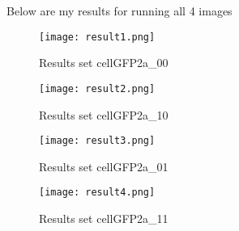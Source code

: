 \documentclass[paper=letter, fontsize=11pt]{scrartcl}
\numberwithin{equation}{section}		%
\numberwithin{figure}{section}			%
\numberwithin{table}{section}				%
\begin{document}
\if

Below are my results for running all 4 images
\begin{figure}[H]
\begin{center}
\texttt{[image: result1.png]}
\end{center}
\caption{Results set cellGFP2a\_00}
\label{fig:resultset1}
\end{figure}
\begin{figure}[H]
\begin{center}
\texttt{[image: result2.png]}
\end{center}
\caption{Results set cellGFP2a\_10}
\label{fig:resultset2}
\end{figure}
\begin{figure}[H]
\begin{center}
\texttt{[image: result3.png]}
\end{center}
\caption{Results set cellGFP2a\_01}
\label{fig:resultset3}
\end{figure}
\begin{figure}[H]
\begin{center}
\texttt{[image: result4.png]}
\end{center}
\caption{Results set cellGFP2a\_11}
\label{fig:resultset4}
\end{figure}

\fi
\end{document}
